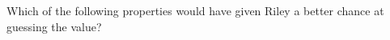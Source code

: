 \documentclass{ximera}
\begin{document}
\begin{problem}
  Which of the following properties would have given Riley a better chance at guessing the value?
  \begin{selectAll}
  \end{selectAll}
\end{problem}



\end{document}

